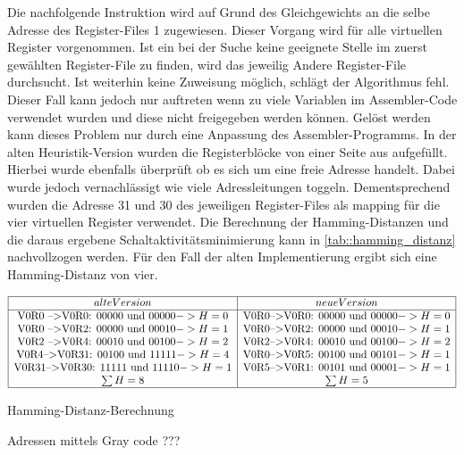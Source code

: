 Die nachfolgende Instruktion wird auf Grund des Gleichgewichts an die selbe Adresse des Register-Files 1 zugewiesen. Dieser Vorgang wird für alle virtuellen Register vorgenommen. Ist ein bei der Suche keine geeignete Stelle im zuerst gewählten Register-File zu finden, wird das jeweilig Andere Register-File durchsucht. Ist weiterhin keine Zuweisung möglich, schlägt der Algorithmus fehl. Dieser Fall kann jedoch nur auftreten wenn zu viele Variablen im Assembler-Code verwendet wurden und diese nicht freigegeben werden können. Gelöst werden kann dieses Problem nur durch eine Anpassung des Assembler-Programms.
In der alten Heuristik-Version wurden die Registerblöcke von einer Seite aus aufgefüllt. Hierbei wurde ebenfalls überprüft ob es sich um eine freie Adresse handelt. Dabei wurde jedoch vernachlässigt wie viele Adressleitungen toggeln. Dementsprechend wurden die Adresse 31 und 30 des jeweiligen Register-Files als mapping für die vier virtuellen Register verwendet.
Die Berechnung der Hamming-Distanzen und die daraus ergebene Schaltaktivitätsminimierung kann in \ref{tab::hamming_distanz} nachvollzogen werden.
Für den Fall der alten Implementierung ergibt sich eine Hamming-Distanz von vier. 

\begin{table}
	\centering
	$ \begin{array}{|c|c|}
	\hline
	alte Version & neue Version \\
	\hline
\text{V0R0 -->V0R0: } 00000 \text{ und } 00000 -> H= 0 &\text{V0R0-->V0R0: } 00000 \text{ und } 00000 -> H= 0\\
\text{V0R0 -->V0R2: } 00000 \text{ und } 00010 -> H= 1 &\text{V0R0-->V0R2: } 00000 \text{ und } 00010 -> H= 1 \\
\text{V0R2 -->V0R4: } 00010 \text{ und } 00100 -> H= 2 &\text{V0R2-->V0R4: } 00010 \text{ und } 00100 -> H= 2 \\
\text{V0R4-->V0R31: } 00100 \text{ und } 11111 -> H= 4 &\text{V0R0-->V0R5: } 00100 \text{ und } 00101 -> H= 1 \\
\text{V0R31-->V0R30: } 11111 \text{ und } 11110 -> H= 1 &\text{V0R5-->V0R1: } 00101 \text{ und } 00001 -> H= 1 \\
	\sum H=8 &\sum H=5 \\
	\hline
	\end{array} $
	\caption{Hamming-Distanz-Berechnung}
	\label{tab::hamming_distanz}
\end{table}

Adressen mittels Gray code ???


